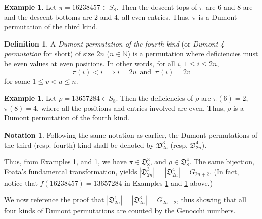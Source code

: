 \documentclass[
final
]{dmtcs-episciences}
\theoremstyle{definition}
\newtheorem{definition}[theorem]{Definition}
\newtheorem{notation}[theorem]{Notation}
\newtheorem{example}[theorem]{Example}
\theoremstyle{remark}
\begin{document}
\begin{example}
\label {Dumont Example 3}
Let $\pi = 16238457 \in S_8$. Then the descent tops of $\pi$ are $6$ and $8$ are and the descent bottoms are $2$ and $4$, all even entries. Thus, $\pi$ is a Dumont permutation of the third kind.
\end{example}

\begin{definition}
A \emph{Dumont permutation of the fourth kind} (or \emph{Dumont-4 permutation} for short) of size $2n$ ($n\in\mathbb{N}$) is a permutation where deficiencies must be even values at even positions. In other words, for all $i$, $1 \leq i \leq 2n$,
$$\pi(i) < i \implies i = 2u \, \text{ and } \, \pi(i) = 2v$$
for some $1 \leq v < u \leq n$.
\end{definition}


\begin{example}
\label {Dumont Example 4}
Let $\rho = 13657284 \in S_8$. Then the deficiencies of $\rho$ are $\pi(6)=2$, $\pi(8)=4$, where all the positions and entries involved are even.  Thus, $\rho$ is a Dumont permutation of the fourth kind.
\end{example}

\begin{notation} Following the same notation as earlier, the Dumont permutations of the third (resp. fourth) kind shall be denoted by $\mathfrak{D}^3_{2n}$ (resp. $\mathfrak{D}^4_{2n}$).
\end{notation}

Thus, from Examples \ref {Dumont Example 3}, and \ref {Dumont Example 4}, we have $\pi \in \mathfrak{D}^3_{8}$, and $\rho \in \mathfrak{D}^4_{8}$.  The same bijection, Foata's fundamental transformation, yields $|\mathfrak{D}^3_{2n}| = |\mathfrak{D}^4_{2n}| = G_{2n+2}$. (In fact, notice that $f(16238457)=13657284$ in Examples \ref{Dumont Example 3} and \ref{Dumont Example 4} above.)


We now reference the proof \cite {Burstein_Third} that  $|\mathfrak{D}^1_{2n}| = |\mathfrak{D}^3_{2n}| = G_{2n+2}$, thus showing that all four kinds of Dumont permutations are counted by the Genocchi numbers.

%
\end{document}
